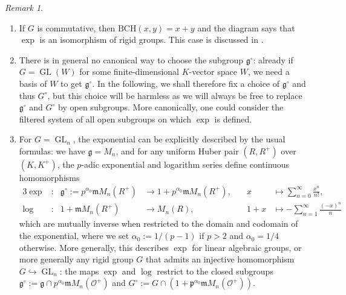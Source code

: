 \documentclass[10pt,a4paper]{article}
\theoremstyle{definition}
\theoremstyle{remark}
\newtheorem{Remark}[thm]{Remark}
\newcommand{\lra}{\longrightarrow}
\renewcommand{\O}{\mathcal{O}}
\newcommand{\m}{\mathfrak{m}}
\newcommand{\mg}{\mathfrak{g}}
\newcommand{\GL}{\operatorname{GL}}
\numberwithin{equation}{section}
\begin{document}
\begin{Remark}\label{ex:exp}\leavevmode
	\begin{enumerate}
		\item 
		If $G$ is commutative, then $\mathrm{BCH}(x,y)=x+y$ and the diagram says that $\exp$ is an isomorphism of rigid groups. This case is discussed in \cite[Section~1.5]{Fargues-groupes-analytiques}.
	      \item There is in general no canonical way to choose the subgroup $\mathfrak g^\circ$: already if $G=\GL(W)$ for some finite-dimensional $K$-vector space $W$, we need a basis of $W$ to get $\mathfrak g^\circ$. In the following, we shall therefore fix a choice of $\mathfrak g^\circ$ and thus $G^\circ$, but this choice will be harmless as we will always be free to replace $\mathfrak g^\circ$ and $G^\circ$ by open subgroups. More canonically, one could consider the filtered  system of all open subgroups on which $\exp$ is defined.
		\item For $G=\GL_n$, the exponential can be explicitly described by the usual formulas: we have $\mg=M_n$, and for any uniform Huber pair  $(R,R^+)$ over $(K,K^+)$, the $p$-adic exponential and logarithm series define continuous homomorphisms
		\begin{alignat*}{3}
			\exp&\colon&\mg^\circ:=p^{\alpha_0}\m M_n(R^+)&\lra 1+p^{\alpha_0}\m M_n(R^+),\quad & x&\longmapsto \textstyle\sum_{n=0}^\infty \frac{x^n}{n!},\\
			\log&\colon&1+\mathfrak mM_n(R^+)&\lra M_n(R),\quad & 1+x&\longmapsto -\textstyle\sum_{n=1}^\infty \frac{(-x)^n}{n}
		\end{alignat*}
		which are mutually inverse when restricted to the domain and codomain of the exponential, where we set $\alpha_0:=1/(p-1)$ if $p>2$ and $\alpha_0=1/4$ otherwise. More generally, this describes $\exp$ for linear algebraic groups, or more generally any rigid group $G$ that admits an injective homomorphism $G\hookrightarrow \GL_n$: the maps $\exp$ and $\log$ restrict to the closed subgroups $\mg^\circ:=\mg\cap p^{\alpha_0}\m M_n(\O^+)$ and $G^\circ:=G\cap (1+\mathfrak p^{\alpha_0}\m M_n(\O^+))$.
	\end{enumerate}
\end{Remark}
\end{document}
